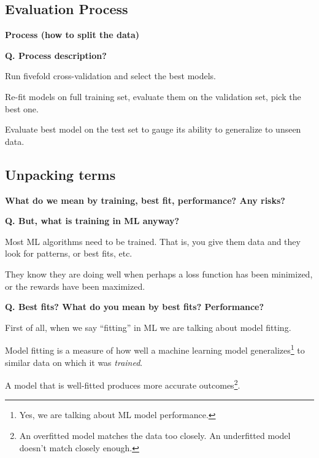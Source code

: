 \subsection{Evaluation Process}
\begin{transitionsubframe}
  \begin{center}
    \Huge \textbf{Process (how to split the data)}
  \end{center}
\end{transitionsubframe}

\begin{frame}[fragile]{\textbf{Q. Process description?}}
  \begin{wideitemize}
  \item Run fivefold cross-validation and select the best models.
  \item Re-fit models on full training set, evaluate them on the validation set, pick the best one.
  \item Evaluate best model on the test set to gauge its ability
  to generalize to unseen data.
  \end{wideitemize}
\end{frame}

\subsection{Unpacking terms}
\begin{transitionsubframe}
  \begin{center}
    \Huge \textbf{What do we mean by training, best fit, performance? Any risks?}
  \end{center}
\end{transitionsubframe}

\begin{frame}[fragile]{\textbf{Q. But, what is training in ML anyway?}}
  \begin{wideitemize}
    \item Most ML algorithms need to be trained. That is, you give
    them data and they look for patterns, or best fits, etc.
    \item They know they are doing well when perhaps a loss function
    has been minimized, or the rewards have been maximized.
  \end{wideitemize}
\end{frame}

\begin{frame}[fragile]{\textbf{Q. Best fits? What do you mean by best fits? Performance?}}
  \begin{wideitemize}
    \item First of all, when we say ``fitting'' in ML we are talking about model fitting.
    \item Model fitting is a measure of how well a machine learning model
    generalizes\footnote{Yes, we are talking about ML model performance.} to similar data
    on which it was \textit{trained}.
    \item A model that is well-fitted produces more accurate outcomes\footnote{An overfitted model
    matches the data too closely. An underfitted model doesn't match closely enough.}.
  \end{wideitemize}
\end{frame}

